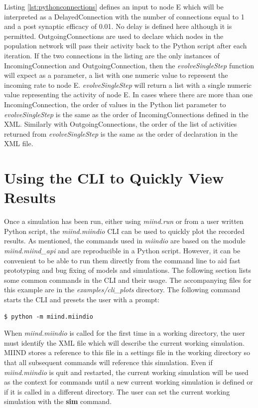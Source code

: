 \documentclass[utf8]{frontiersSCNS} %
\begin{document}
Listing \ref{lst:pythonconnections} defines an input to node E which will be interpreted as a DelayedConnection with the number of connections equal to 1 and a post synaptic efficacy of 0.01. No delay is defined here although it is permitted. OutgoingConnections are used to declare which nodes in the population network will pass their activity back to the Python script after each iteration. If the two connections in the listing are the only instances of IncomingConnection and OutgoingConnection, then the \textit{evolveSingleStep} function will expect as a parameter, a list with one numeric value to represent the incoming rate to node E. \textit{evolveSingleStep} will return a list with a single numeric value representing the activity of node E. In cases where there are more than one IncomingConnection, the order of values in the Python list parameter to \textit{evolveSingleStep} is the same as the order of IncomingConnections defined in the XML. Similarly with OutgoingConnections, the order of the list of activities returned from \textit{evolveSingleStep} is the same as the order of declaration in the XML file.

\section{Using the CLI to Quickly View Results}
\label{workflow}
Once a simulation has been run, either using \textit{miind.run} or from a user written Python script, the \textit{miind.miindio} CLI can be used to quickly plot the recorded results. As mentioned, the commands used in \textit{miindio} are based on the module \textit{miind.miind\_api} and are reproducible in a Python script. However, it can be convenient to be able to run them directly from the command line to aid fast prototyping and bug fixing of models and simulations. The following section lists some common commands in the CLI and their usage. The accompanying files for this example are in the \textit{examples/cli\_plots} directory. The following command starts the CLI and presets the user with a prompt:

\begin{lstlisting}[language=xml,caption={Run the CLI.}]
$ python -m miind.miindio
\end{lstlisting}

When \textit{miind.miindio} is called for the first time in a working directory, the user must identify the XML file which will describe the current working simulation. MIIND stores a reference to this file in a settings file in the working directory so that all subsequent commands will reference this simulation. Even if \textit{miind.miindio} is quit and restarted, the current working simulation will be used as the context for commands until a new current working simulation is defined or if it is called in a different directory. The user can set the current working simulation with the \textbf{sim} command. 
\end{document}
